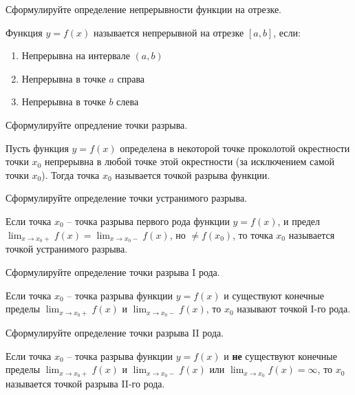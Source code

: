\begin{question}
  Сформулируйте определение непрерывности функции на отрезке.
\end{question}
\begin{answer}
  Функция $y = f(x) $ называется непрерывной на отрезке $[a, b]$, если:
  \begin{enumerate}
    \item Непрерывна на интервале $(a, b)$
    \item Непрерывна в точке $a$ справа
    \item Непрерывна в точке $b$ слева
  \end{enumerate}
\end{answer}

\begin{question}
  Сформулируйте опредление точки разрыва.
\end{question}
\begin{answer}
  Пусть функция $y = f(x)$ определена в некоторой точке проколотой окрестности точки $x_0$ непрерывна в любой точке этой окрестности (за исключением самой точки $x_0$).
  Тогда точка $x_0$ называется точкой разрыва функции.
\end{answer}

\begin{question}
  Сформулируйте определение точки устранимого разрыва.
\end{question}
\begin{answer}
  Если точка $x_0$ -- точка разрыва первого рода функции $y = f(x)$, и предел  $\lim_{x \to x_0+} f(x) = \lim_{x \to x_0-} f(x)$, но $\neq f(x_0)$, то точка $x_0$ называется точкой устранимого разрыва.
\end{answer}

\begin{question}
  Сформулируйте определение точки разрыва I рода.
\end{question}
\begin{answer}
  Если точка $x_0$ -- точка разрыва функции $y = f(x)$ и существуют конечные пределы $\lim_{x \to x_0+} f(x)$ и $\lim_{x \to x_0-} f(x)$, то $x_0$ называют точкой I-го рода.
\end{answer}

\begin{question}
  Сформулируйте определение точки разрыва II рода.
\end{question}
\begin{answer}
  Если точка $x_0$ -- точка разрыва функции $y = f(x)$ и \textbf{не} существуют конечные пределы $\lim_{x \to x_0+} f(x)$ и $\lim_{x \to x_0-} f(x)$ или $\lim_{x \to x_0} f(x) = \infty$, то $x_0$ называется точкой разрыва II-го рода.
\end{answer}


